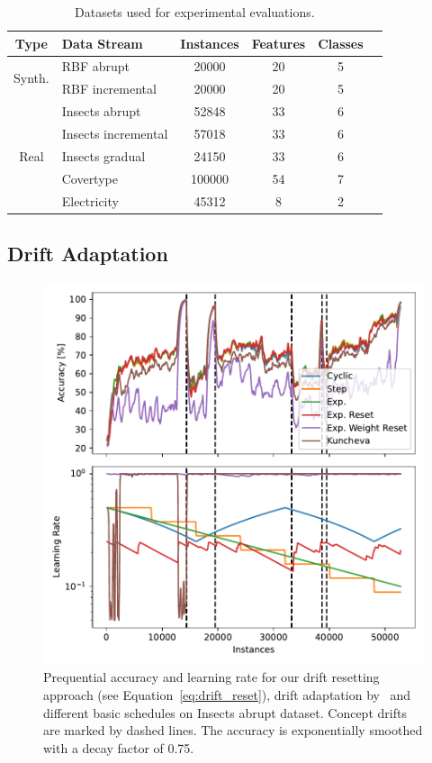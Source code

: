 \documentclass[letterpaper]{article} %
\begin{document}
\begin{table}[]
	\small
	\begin{tabular}{@{}clcccc@{}}
		\toprule
		Type                    & Data Stream               & Instances & Features & Classes \\
		\midrule
		\multirow{2}{*}{Synth.} & RBF abrupt                & 20000     & 20       & 5       \\
		                        & RBF incremental           & 20000     & 20       & 5       \\
		\midrule
		\multirow{5}{*}{Real}   & Insects abrupt            & 52848     & 33       & 6       \\
		                        & Insects incremental       & 57018     & 33       & 6       \\
		                        & Insects gradual           & 24150     & 33       & 6       \\
		                        & Covertype\footnotemark[3] & 100000    & 54       & 7       \\
		                        & Electricity               & 45312     & 8        & 2       \\
		\bottomrule
	\end{tabular}
	\caption{Datasets used for experimental evaluations.}
	\label{tab:datasets}
\end{table}



\subsection{Drift Adaptation}

\begin{figure}[h]
	\centering
	\includegraphics[width=.47\textwidth]{figures/lr_norms_schedules_insects_abrupt.pdf}
	\caption{Prequential accuracy and learning rate for our drift resetting approach (see Equation~\eqref{eq:drift_reset}), drift adaptation by~\citet{kunchevaAdaptiveLearningRate2008} and different basic schedules on Insects abrupt dataset. Concept drifts are marked by dashed lines. The accuracy is exponentially smoothed with a decay factor of 0.75.}
	\label{fig:prequential_schedulers_insects}
\end{figure}
\end{document}
